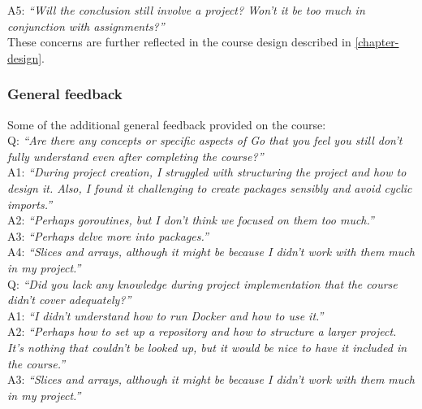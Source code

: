 \documentclass[
  digital,
  color,
  oneside,
  nosansbold,
  nocolorbold,
  nolof,
  nolot,
]{fithesis4}
\begin{document}
\noindent
A5: \textit{\enquote{Will the conclusion still involve a project? Won't it be too much in conjunction with assignments?}} \\

\noindent
These concerns are further reflected in the course design described in \cref{chapter-design}. \\

\subsubsection{General feedback}\label{general-feedback}

\noindent
Some of the additional general feedback provided on the course: \\

\noindent
Q: \textit{\enquote{Are there any concepts or specific aspects of Go that you feel you still don't fully understand even after completing the course?}} \\

\noindent
A1: \textit{\enquote{During project creation, I struggled with structuring the project and how to design it. Also, I found it challenging to create packages sensibly and avoid cyclic imports.}} \\

\noindent
A2: \textit{\enquote{Perhaps goroutines, but I don't think we focused on them too much.}} \\

\noindent
A3: \textit{\enquote{Perhaps delve more into packages.}} \\

\noindent
A4: \textit{\enquote{Slices and arrays, although it might be because I didn't work with them much in my project.}} \\

\noindent
Q: \textit{\enquote{Did you lack any knowledge during project implementation that the course didn't cover adequately?}} \\

\noindent
A1: \textit{\enquote{I didn't understand how to run Docker and how to use it.}} \\

\noindent
A2: \textit{\enquote{Perhaps how to set up a repository and how to structure a larger project. It's nothing that couldn't be looked up, but it would be nice to have it included in the course.}} \\

\noindent
A3: \textit{\enquote{Slices and arrays, although it might be because I didn't work with them much in my project.}} \\
\end{document}
